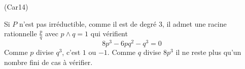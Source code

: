 \begin{tiny}(Car14)\end{tiny}
Si $P$ n'est pas irréductible, comme il est de degré $3$, il admet une racine rationnelle $\frac{p}{q}$ avec $p\wedge q=1$ qui vérifient
\begin{displaymath}
 8p^3-6pq^2-q^3=0
\end{displaymath}
Comme $p$ divise $q^3$, c'est $1$ ou $-1$. Comme $q$ divise $8p^3$ il ne reste plus qu'un nombre fini de cas à vérifier.